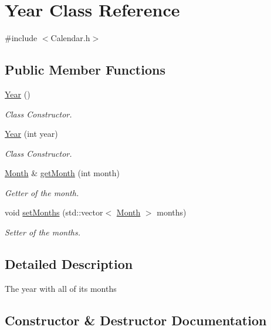 \hypertarget{class_year}{}\section{Year Class Reference}
\label{class_year}


{\ttfamily \#include $<$Calendar.\+h$>$}

\subsection*{Public Member Functions}
\begin{DoxyCompactItemize}
\item 
\mbox{\label{class_year_af5910fa97849bd9b700262477fd1fd24}} 
\mbox{\hyperlink{class_year_af5910fa97849bd9b700262477fd1fd24}{Year}} ()
\begin{DoxyCompactList}\small\item\em Class Constructor. \end{DoxyCompactList}\item 
\mbox{\hyperlink{class_year_ac18a4f513e8ee98b352990c6f54bd663}{Year}} (int year)
\begin{DoxyCompactList}\small\item\em Class Constructor. \end{DoxyCompactList}\item 
\mbox{\hyperlink{class_month}{Month}} \& \mbox{\hyperlink{class_year_a64bc478fe629fc966b7bfadb1d939a88}{get\+Month}} (int month)
\begin{DoxyCompactList}\small\item\em Getter of the month. \end{DoxyCompactList}\item 
void \mbox{\hyperlink{class_year_a1478407d9100f722e54daaf1ce2a413c}{set\+Months}} (std\+::vector$<$ \mbox{\hyperlink{class_month}{Month}} $>$ months)
\begin{DoxyCompactList}\small\item\em Setter of the months. \end{DoxyCompactList}\end{DoxyCompactItemize}


\subsection{Detailed Description}
The year with all of its months 

\subsection{Constructor \& Destructor Documentation}
\mbox{\label{class_year_ac18a4f513e8ee98b352990c6f54bd663}} 
